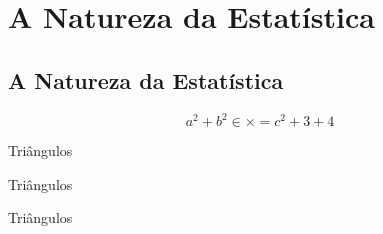 \documentclass[professor]{livroabertoem}
\author{Tarso Boudet Caldas \and Tarso Caldas}
\begin{document}
\frontmatter

\tableofcontents*

\mainmatter
\chapter{A Natureza da Estatística}

\taskintoc

\begin{teacherintroduction}
\lipsum[2]

\begin{habilities}
\end{habilities}

\begin{habilities}[EF]
\end{habilities}

\lipsum[3-5]

\end{teacherintroduction}

\section{A Natureza da Estatística}

\lipsum[1-3]


\lipsum[1]
\[
    a^2 + b^2 \in \times = c^2 + 3 + 4
\]

\begin{task}{Triângulos}
\begin{teacher}
  \lipsum[12]
  \lipsum[13]
  \lipsum[13]
\end{teacher}

\lipsum[2]
\end{task}

\lipsum[3]


\begin{example}{Triângulos}
  \lipsum[4]
\end{example}

\newpage

\begin{knowledge}
  \lipsum[6]
\end{knowledge}

\begin{observation}{Triângulos}
  \lipsum[5]
\end{observation}
\begin{reflection}
  \lipsum[6]
\end{reflection}
\end{document}
